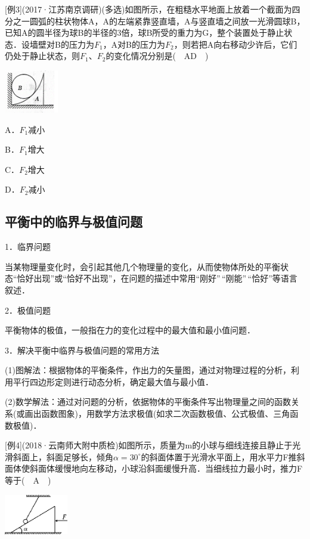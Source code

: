 {[}例3{]}(2017·江苏南京调研)(多选)如图所示，在粗糙水平地面上放着一个截面为四分之一圆弧的柱状物体A，A的左端紧靠竖直墙，A与竖直墙之间放一光滑圆球B，已知A的圆半径为球B的半径的3倍，球B所受的重力为G，整个装置处于静止状态．设墙壁对B的压力为$F_1$，A对B的压力为$F_2$，则若把A向右移动少许后，它们仍处于静止状态，则$F_1$、$F_2$的变化情况分别是(　AD　)

\begin{center}\includegraphics[width=0.92708in,height=0.73958in]{media/image86.png}\end{center}

A．$F_1$减小 

B．$F_1$增大

C．$F_2$增大 

D．$F_2$减小
\newpage
\subsection{平衡中的临界与极值问题}

1．临界问题

当某物理量变化时，会引起其他几个物理量的变化，从而使物体所处的平衡状态``恰好出现''或``恰好不出现''，在问题的描述中常用``刚好''\,``刚能''\,``恰好''等语言叙述．

2．极值问题

平衡物体的极值，一般指在力的变化过程中的最大值和最小值问题．

3．解决平衡中临界与极值问题的常用方法

(1)图解法：根据物体的平衡条件，作出力的矢量图，通过对物理过程的分析，利用平行四边形定则进行动态分析，确定最大值与最小值．

(2)数学解法：通过对问题的分析，依据物体的平衡条件写出物理量之间的函数关系(或画出函数图象)，用数学方法求极值(如求二次函数极值、公式极值、三角函数极值)．

{[}例4{]}(2018·云南师大附中质检)如图所示，质量为m的小球与细线连接且静止于光滑斜面上，斜面足够长，倾角$\alpha=30^\circ$的斜面体置于光滑水平面上，用水平力F推斜面体使斜面体缓慢地向左移动，小球沿斜面缓慢升高．当细线拉力最小时，推力F等于(　A　)

\begin{center}\includegraphics[width=1.09375in,height=0.6875in]{media/image87.png}\end{center}

